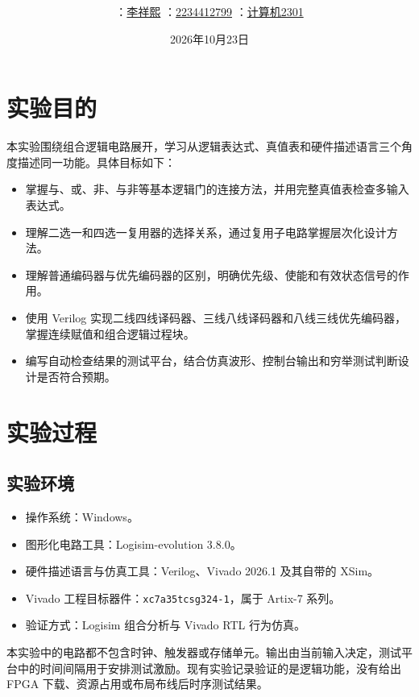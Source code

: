 \documentclass[12pt,a4paper,fontset=fandol]{ctexart}
\title{\reporttitle\\[0.5em]\large\subtask}
\author{\authname：\underline{李祥熙}\quad
        \authid：\underline{2234412799}\quad
        \class：\underline{计算机2301}}
\date{2026年10月23日}
\begin{document}
\maketitle
\tableofcontents
\newpage

\section{实验目的}

本实验围绕组合逻辑电路展开，学习从逻辑表达式、真值表和硬件描述语言三个角度描述同一功能。具体目标如下：
\begin{itemize}
  \item 掌握与、或、非、与非等基本逻辑门的连接方法，并用完整真值表检查多输入表达式。
  \item 理解二选一和四选一复用器的选择关系，通过复用子电路掌握层次化设计方法。
  \item 理解普通编码器与优先编码器的区别，明确优先级、使能和有效状态信号的作用。
  \item 使用 Verilog 实现二线四线译码器、三线八线译码器和八线三线优先编码器，掌握连续赋值和组合逻辑过程块。
  \item 编写自动检查结果的测试平台，结合仿真波形、控制台输出和穷举测试判断设计是否符合预期。
\end{itemize}

\section{实验过程}

\subsection{实验环境}

\begin{itemize}
  \item 操作系统：Windows。
  \item 图形化电路工具：Logisim-evolution 3.8.0。
  \item 硬件描述语言与仿真工具：Verilog、Vivado 2026.1 及其自带的 XSim。
  \item Vivado 工程目标器件：\texttt{xc7a35tcsg324-1}，属于 Artix-7 系列。
  \item 验证方式：Logisim 组合分析与 Vivado RTL 行为仿真。
\end{itemize}

本实验中的电路都不包含时钟、触发器或存储单元。输出由当前输入决定，测试平台中的时间间隔用于安排测试激励。现有实验记录验证的是逻辑功能，没有给出 FPGA 下载、资源占用或布局布线后时序测试结果。
\end{document}
